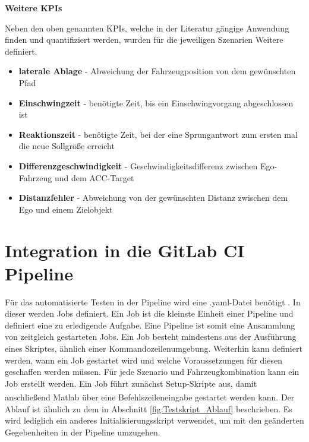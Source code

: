 \bigskip\noindent\textbf{Weitere KPIs}

\noindent Neben den oben genannten KPIs, welche in der Literatur gängige Anwendung finden und quantifiziert werden, wurden für die jeweiligen Szenarien Weitere definiert.

\begin{itemize}
    \item \textbf{laterale Ablage} - Abweichung der Fahrzeugposition von dem gewünschten Pfad
    \item \textbf{Einschwingzeit} - benötigte Zeit, bis ein Einschwingvorgang abgeschlossen ist
    \item \textbf{Reaktionszeit} - benötigte Zeit, bei der eine Sprungantwort zum ersten mal die neue Sollgröße erreicht 
    \item \textbf{Differenzgeschwindigkeit} - Geschwindigkeitsdifferenz zwischen Ego-Fahrzeug und dem ACC-Target
    \item \textbf{Distanzfehler} - Abweichung von der gewünschten Distanz zwischen dem Ego und einem Zielobjekt
\end{itemize}

\section{Integration in die GitLab CI Pipeline} \label{sec:CIPipeline}
Für das automatisierte Testen in der Pipeline wird eine .yaml-Datei benötigt \cite{GitLabDoks}. In dieser werden Jobs definiert. Ein Job ist die kleinste Einheit einer Pipeline und definiert eine zu erledigende Aufgabe. Eine Pipeline ist somit eine Ansammlung von zeitgleich gestarteten Jobs. Ein Job besteht mindestens aus der Ausführung eines Skriptes, ähnlich einer Kommandozeilenumgebung. Weiterhin kann definiert werden, wann ein Job gestartet wird und welche Voraussetzungen für diesen geschaffen werden müssen.
Für jede Szenario und Fahrzeugkombination kann ein Job erstellt werden. Ein Job führt zunächst Setup-Skripte aus, damit anschließend Matlab\textsuperscript{\textregistered} über eine Befehlszeileneingabe gestartet werden kann. Der Ablauf ist ähnlich zu dem in Abschnitt \ref{fig:Testskript_Ablauf} beschrieben. Es wird lediglich ein anderes Initialisierungsskript verwendet, um mit den geänderten Gegebenheiten in der Pipeline umzugehen.

